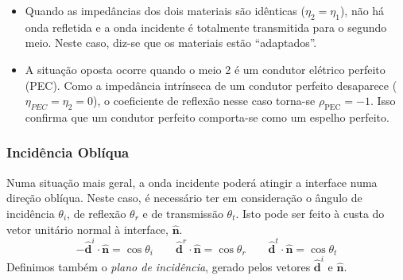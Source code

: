 \begin{warning}
    \begin{itemize}
        \item  Quando as impedâncias dos dois materiais são idênticas ($\eta_2 = \eta_1$), não há onda refletida e a onda incidente é totalmente transmitida para o segundo meio. Neste caso, diz-se que os materiais estão ``adaptados''.
        
        \item A situação oposta ocorre quando o meio 2 é um condutor elétrico perfeito (PEC). Como a impedância intrínseca de um condutor perfeito desaparece ($\eta_{PEC} = \eta_2 = 0$), o coeficiente de reflexão nesse caso torna-se $\rho_{\text{PEC}} = -1$. Isso confirma que um condutor perfeito comporta-se como um espelho perfeito.    
    \end{itemize}
\end{warning}

\subsubsection{Incidência Oblíqua}

Numa situação mais geral, a onda incidente poderá atingir a interface numa direção oblíqua. Neste caso, é necessário ter em consideração o ângulo de incidência $\theta_i$, de reflexão $\theta_r$ e de transmissão $\theta_t$. Isto pode ser feito à custa do vetor unitário normal à interface, $\mathbf{\hat{n}}$.
\begin{equation}
    -\mathbf{\hat{d}}^i \cdot \mathbf{\hat{n}} = \cos \theta_i
    \qquad
    \mathbf{\hat{d}}^r \cdot \mathbf{\hat{n}} = \cos \theta_r
    \qquad
    \mathbf{\hat{d}}^t \cdot \mathbf{\hat{n}} = \cos \theta_t
\end{equation}
Definimos também o \emph{plano de incidência}, gerado pelos vetores $\mathbf{\hat{d}}^i$ e $\mathbf{\hat{n}}$.

